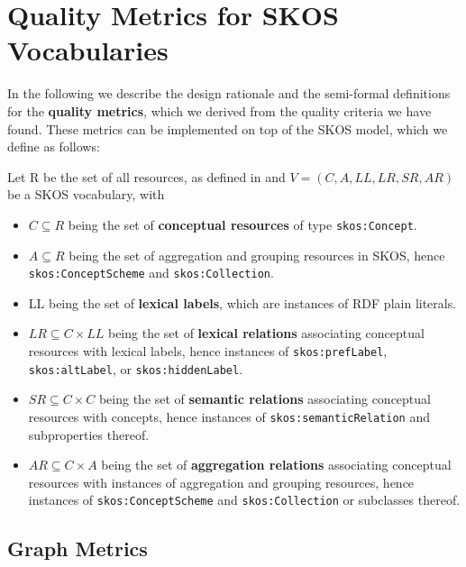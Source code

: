 
\section{Quality Metrics for SKOS Vocabularies}\label{sec:metrics}

In the following we describe the design rationale and the semi-formal definitions for the \textbf{quality metrics}, which we derived from the quality criteria we have found. These metrics can be implemented on top of the SKOS model, which we define as follows:


\begin{definition} Let R be the set of all resources, as defined in \cite{Jacobs2004} and $V = (C, A, LL, LR, SR, AR)$ be a SKOS vocabulary, with

\begin{itemize}
	\item \(C \subseteq R\) being the set of \textbf{conceptual resources} of type \texttt{skos:Concept}.
	\item \(A \subseteq R\) being the set of aggregation and grouping resources in SKOS, hence \texttt{skos:ConceptScheme} and \texttt{skos:Collection}.
	\item LL being the set of \textbf{lexical labels}, which are instances of RDF plain literals.
	\item \(LR \subseteq C \times LL\) being the set of \textbf{lexical relations} associating conceptual resources with lexical labels, hence instances of \texttt{skos:prefLabel}, \texttt{skos:altLabel}, or \texttt{skos:hiddenLabel}.
\item \(SR \subseteq C \times C\) being the set of \textbf{semantic relations} associating conceptual resources with concepts, hence instances of \texttt{skos:semanticRelation} and subproperties thereof.
\item \(AR \subseteq C \times A\) being the set of \textbf{aggregation relations} associating conceptual resources with instances of aggregation and grouping resources, hence instances of \texttt{skos:ConceptScheme} and \texttt{skos:Collection} or subclasses thereof.
\end{itemize}

\end{definition}


\subsection{Graph Metrics}

